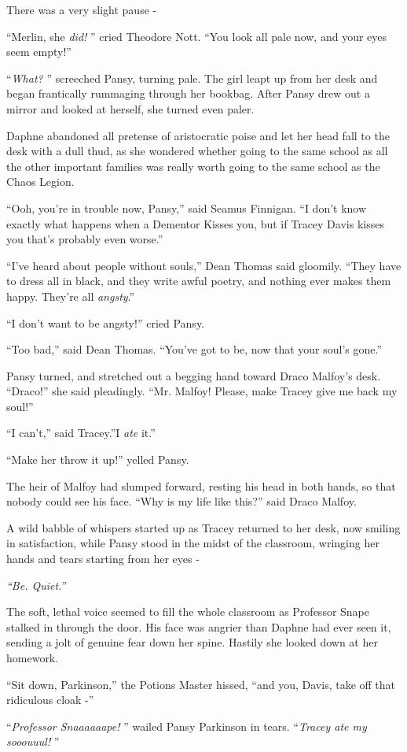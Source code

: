 There was a very slight pause -

``Merlin, she \emph{did!} '' cried Theodore Nott. ``You look all pale now,
and your eyes seem empty!''

``\emph{What?} '' screeched Pansy, turning pale. The girl leapt up from
her desk and began frantically rummaging through her bookbag. After
Pansy drew out a mirror and looked at herself, she turned even paler.

Daphne abandoned all pretense of aristocratic poise and let her head
fall to the desk with a dull thud, as she wondered whether going to the
same school as all the other important families was really worth going
to the same school as the Chaos Legion.

``Ooh, you're in trouble now, Pansy,'' said Seamus Finnigan. ``I don't
know exactly what happens when a Dementor Kisses you, but if Tracey
Davis kisses you that's probably even worse.''

``I've heard about people without souls,'' Dean Thomas said gloomily.
``They have to dress all in black, and they write awful poetry, and
nothing ever makes them happy. They're all \emph{angsty}.''

``I don't want to be angsty!'' cried Pansy.

``Too bad,'' said Dean Thomas. ``You've got to be, now that your soul's
gone.''

Pansy turned, and stretched out a begging hand toward Draco Malfoy's
desk. ``Draco!'' she said pleadingly. ``Mr. Malfoy! Please, make Tracey
give me back my soul!''

``I can't,'' said Tracey.''I \emph{ate} it.''

``Make her throw it up!'' yelled Pansy.

The heir of Malfoy had slumped forward, resting his head in both hands,
so that nobody could see his face. ``Why is my life like this?'' said
Draco Malfoy.

A wild babble of whispers started up as Tracey returned to her desk, now
smiling in satisfaction, while Pansy stood in the midst of the
classroom, wringing her hands and tears starting from her eyes -

\emph{``Be. Quiet.''}

The soft, lethal voice seemed to fill the whole classroom as Professor
Snape stalked in through the door. His face was angrier than Daphne had
ever seen it, sending a jolt of genuine fear down her spine. Hastily she
looked down at her homework.

``Sit down, Parkinson,'' the Potions Master hissed, ``and you, Davis,
take off that ridiculous cloak -''

``\emph{Professor Snaaaaaape!} '' wailed Pansy Parkinson in tears.
``\emph{Tracey ate my sooouuul!} ''
